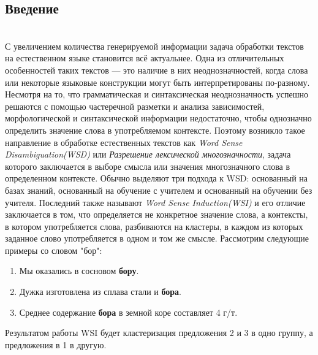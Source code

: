 \documentclass[11pt]{article}
\begin{document}
    \begin{multicols}{2}
        \section*{Введение}\label{sec:intro}
        \\С увеличением количества генерируемой информации задача обработки текстов на естественном языке становится всё
        актуальнее.
        Одна из отличительных особенностей таких текстов — это наличие в них неоднозначностей, когда слова
        или некоторые языковые конструкции могут быть интерпретированы по-разному.
        Несмотря на то, что грамматическая и синтаксическая неоднозначность успешно решаются с помощью
        частеречной разметки и анализа зависимостей, морфологической и синтаксической информации недостаточно, чтобы
        однозначно определить значение слова в употребляемом контексте.
        Поэтому возникло такое направление в обработке естественных текстов как \textit{Word Sense Disambiguation(WSD)}
        или \textit{Разрешение лексической многозначности}, задача которого заключается в выборе смысла или значения
        многозначного слова в определенном контексте.
        Обычно выделяют три подхода к WSD: основанный на базах знаний, основанный на обучение с учителем и
        основанный на обучении без учителя.
        Последний также называют \textit{Word Sense Induction(WSI)} и его отличие
        заключается в том, что определяется не конкретное значение слова, а контексты, в котором употребляется слова,
        разбиваются на кластеры, в каждом из которых заданное слово употребляется в одном и том же смысле.
        Рассмотрим следующие примеры со словом "бор":
        \begin{enumerate}
        \item Мы оказались в сосновом \textbf{бору}.
        \item Дужка изготовлена из сплава стали и \textbf{бора}.
        \item Среднее содержание \textbf{бора} в земной коре составляет 4 г/т.
        \end{enumerate}
        Результатом работы WSI будет кластеризация предложения 2 и 3 в одно группу, а предложения в 1 в другую.
        
    \end{multicols}
\end{document}
